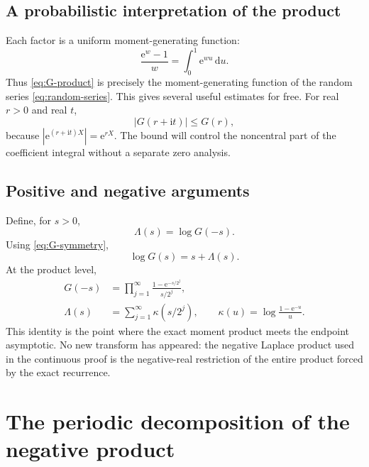 \documentclass[11pt,oneside]{article}
\theoremstyle{definition}
\theoremstyle{remark}
\newcommand{\e}{\mathrm e}
\newcommand{\ii}{\mathrm i}
\newcommand{\dd}{\,\mathrm d}
\begin{document}
\subsection{A probabilistic interpretation of the product}

Each factor is a uniform moment-generating function:
\begin{equation}
 \frac{\e^w-1}{w}=\int_0^1\e^{wu}\dd u.
\label{eq:uniform-mgf}
\end{equation}
Thus \eqref{eq:G-product} is precisely the moment-generating function of the random series \eqref{eq:random-series}.  This gives several useful estimates for free.  For real $r>0$ and real $t$,
\begin{equation}
 |G(r+\ii t)|\le G(r),
\label{eq:G-vertical-bound}
\end{equation}
because $|\e^{(r+\ii t)X}|=\e^{rX}$.  The bound will control the noncentral part of the coefficient integral without a separate zero analysis.

\subsection{Positive and negative arguments}

Define, for $s>0$,
\begin{equation}
 \Lambda(s)=\log G(-s).
\label{eq:Lambda-def}
\end{equation}
Using \eqref{eq:G-symmetry},
\begin{equation}
 \log G(s)=s+\Lambda(s).
\label{eq:positive-negative-log}
\end{equation}
At the product level,
\begin{align}
 G(-s)
 &=\prod_{j=1}^{\infty}
 \frac{1-\e^{-s/2^j}}{s/2^j},                              \label{eq:negative-product}\\
 \Lambda(s)
 &=\sum_{j=1}^{\infty}\kappa(s/2^j),
 \qquad
 \kappa(u)=\log\frac{1-\e^{-u}}u.                         \label{eq:Lambda-harmonic}
\end{align}
This identity is the point where the exact moment product meets the endpoint asymptotic.  No new transform has appeared: the negative Laplace product used in the continuous proof is the negative-real restriction of the entire product forced by the exact recurrence.

\section{The periodic decomposition of the negative product}
\label{sec:periodic-decomposition}
\end{document}
